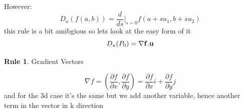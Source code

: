 \documentclass[11pt]{article}
\theoremstyle{definition}
\newtheorem{reg}{Rule}
\begin{document}
However:
\begin{equation}
	D_u(f(a,b)) = \frac{d}{ds} |_{s=0} f(a+su_1, b+su_2)
\end{equation}
this rule is a bit amibgious so lets look at the easy form of it
\begin{equation}
	D_u(P_0)=\bf  \nabla f . u 
\end{equation}
\begin{reg}
Gradient Vectors
\end{reg}
\begin{equation}
	\nabla f = ( \frac{\partial f}{\partial x}, \frac{\partial f}{\partial y} ) = \frac{\partial f}{\partial x} i + \frac{\partial f}{\partial y} j
\end{equation}
and for the 3d case it's the same but we add another variable, hence another term in the vector in k direction \\
\end{document}
